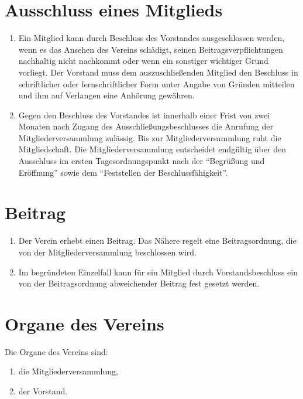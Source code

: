 \documentclass[a4paper]{article}
\begin{document}
\section{Ausschluss eines Mitglieds}
\begin{enumerate}
	\item Ein Mitglied kann durch Beschluss des Vorstandes ausgeschlossen werden, wenn es das Ansehen des Vereins schädigt, seinen Beitragsverpflichtungen nachhaltig nicht nachkommt oder wenn ein sonstiger wichtiger Grund vorliegt. Der Vorstand muss dem auszuschließenden Mitglied den Beschluss in schriftlicher oder fernschriftlicher Form unter Angabe von Gründen mitteilen und ihm auf Verlangen eine Anhörung gewähren.
	\item Gegen den Beschluss des Vorstandes ist innerhalb einer Frist von zwei Monaten nach Zugang des Ausschließungsbeschlusses die Anrufung der Mitgliederversammlung zulässig. Bis zur Mitgliederversammlung ruht die Mitgliedschaft. Die Mitgliederversammlung entscheidet endgültig über den Ausschluss im ersten Tagesordnungspunkt nach der \enquote{Begrüßung und Eröffnung} sowie dem \enquote{Feststellen der Beschlussfähigkeit}.
\end{enumerate}

\section{Beitrag}
\begin{enumerate}
	\item Der Verein erhebt einen Beitrag. Das Nähere regelt eine Beitragsordnung, die von der Mitgliederversammlung beschlossen wird.
	\item Im begründeten Einzelfall kann für ein Mitglied durch Vorstandsbeschluss ein von der Beitragsordnung abweichender Beitrag fest gesetzt werden.
\end{enumerate}

\section{Organe des Vereins}
Die Organe des Vereins sind:
\begin{enumerate}[1.]
	\item die Mitgliederversammlung,
	\item der Vorstand.
\end{enumerate}
\end{document}
